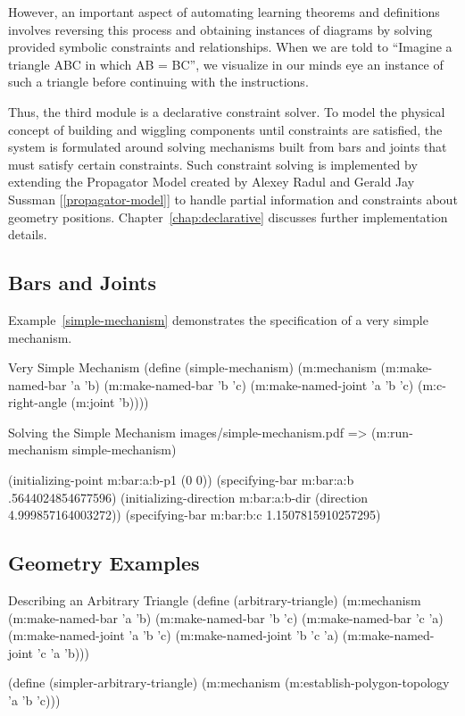 However, an important aspect of automating learning theorems and
definitions involves reversing this process and obtaining instances of
diagrams by solving provided symbolic constraints and
relationships. When we are told to ``Imagine a triangle ABC in which
AB = BC'', we visualize in our minds eye an instance of such a
triangle before continuing with the instructions.

Thus, the third module is a declarative constraint solver. To model
the physical concept of building and wiggling components until
constraints are satisfied, the system is formulated around solving
mechanisms built from bars and joints that must satisfy certain
constraints. Such constraint solving is implemented by extending the
Propagator Model created by Alexey Radul and Gerald Jay Sussman
[\ref{propagator-model}] to handle partial information and constraints
about geometry positions. Chapter~\ref{chap:declarative} discusses
further implementation details.

\subsection{Bars and Joints}

Example~\ref{simple-mechanism} demonstrates the specification of a
very simple mechanism.

\begin{code-example}
[label=simple-mechanism]
{Very Simple Mechanism}
(define (simple-mechanism)
  (m:mechanism
   (m:make-named-bar 'a 'b)
   (m:make-named-bar 'b 'c)
   (m:make-named-joint 'a 'b 'c)
   (m:c-right-angle (m:joint 'b))))
\end{code-example}

\begin{pdf-example}
[label=solving-simple-mechanism]
{Solving the Simple Mechanism}
{images/simple-mechanism.pdf}
=> (m:run-mechanism simple-mechanism)

(initializing-point m:bar:a:b-p1 (0 0))
(specifying-bar m:bar:a:b .5644024854677596)
(initializing-direction m:bar:a:b-dir (direction 4.999857164003272))
(specifying-bar m:bar:b:c 1.1507815910257295)
\end{pdf-example}

\subsection{Geometry Examples}

\begin{code-example}
[label=arbitrary-tri]
{Describing an Arbitrary Triangle}
(define (arbitrary-triangle)
  (m:mechanism
   (m:make-named-bar 'a 'b)
   (m:make-named-bar 'b 'c)
   (m:make-named-bar 'c 'a)
   (m:make-named-joint 'a 'b 'c)
   (m:make-named-joint 'b 'c 'a)
   (m:make-named-joint 'c 'a 'b)))

(define (simpler-arbitrary-triangle)
  (m:mechanism
   (m:establish-polygon-topology 'a 'b 'c)))
\end{code-example}

